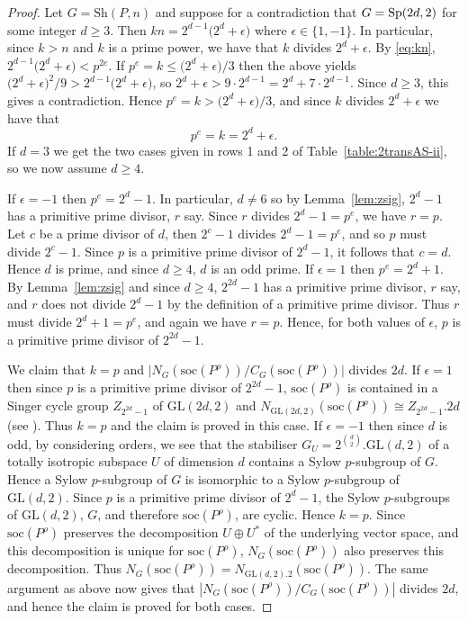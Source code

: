 \documentclass[12pt]{amsart}
\theoremstyle{remark}
\theoremstyle{definition}
\newcounter{claim}[thm]
\newcommand{\soc}{\mathrm{soc}}
\newcommand{\sh}{\mathrm{Sh}}
\newcommand{\GL}{\mathrm{GL}}
\newcommand{\AGL}{\mathrm{AGL}}
\newcommand{\Sp}{\textnormal{Sp}}
\begin{document}
\begin{proof}
Let $G = \sh(P,n)$ and suppose for a contradiction that $G = \Sp(2d,2)$ for some integer $d \geqslant 3$. Then $kn = 2^{d-1}\big(2^d + \epsilon\big)$ where $\epsilon \in \{1,-1\}$. In particular, since $k > n$ and $k$ is a prime power, we have that $k$ divides $2^d + \epsilon$. By \eqref{eq:kn}, $2^{d-1}\big(2^d + \epsilon\big) < p^{2e}$. If $p^e = k \leqslant \big(2^d + \epsilon\big)/3$ then the above yields $\big(2^d + \epsilon\big)^2/9 > 2^{d-1}\big(2^d + \epsilon\big)$, so $2^d + \epsilon > 9 \cdot 2^{d-1} = 2^d + 7 \cdot 2^{d-1}$. Since $d \geqslant 3$, this gives a contradiction. Hence $p^e = k > \big(2^d + \epsilon\big)/3$, and since $k$ divides $2^d + \epsilon$ we have that
	\[ p^e = k = 2^d + \epsilon. \]
 If $d=3$ we get the two cases given in rows 1 and 2 of Table~\ref{table:2transAS-ii}, so we now assume $d\geqslant 4$. 

If $\epsilon = -1$ then $p^e = 2^d - 1$. In particular, $d\neq 6$ so by Lemma~\ref{lem:zsig}, $2^d-1$ has a primitive prime divisor, $r$ say. Since $r$ divides $2^d-1=p^e$, we have $r=p$. Let $c$ be a prime divisor of  $d$, then  $2^c-1$ divides $2^d-1=p^e$, and so $p$ must divide $2^c-1$. Since $p$ is a primitive prime divisor of $2^d-1$, it follows that $c=d$. Hence $d$ is prime, and since $d\geqslant 4$, $d$ is an odd prime.  
 If $\epsilon = 1$ then $p^e = 2^d + 1$.
By Lemma~\ref{lem:zsig} and since $d\geqslant 4$, $2^{2d} - 1$ has a primitive prime divisor, $r$ say, and $r$ does not divide $2^d-1$ by the definition of a primitive prime divisor. Thus $r$ must divide $2^d+1=p^e$, and again we have $r=p$. Hence, for both values of $\epsilon$, $p$ is a primitive prime divisor of $2^{2d}-1$.


We  claim that $k=p$ and $\big|N_G(\soc(P^\rho))/C_G(\soc(P^\rho))\big|$ divides $2d$. If $\epsilon = 1$    then since $p$ is a primitive prime divisor of $2^{2d}-1$, $\soc(P^\rho)$ is contained in a Singer cycle group $Z_{2^{2d}-1}$ of $\GL(2d,2)$ and $N_{\GL(2d,2)}(\soc(P^\rho)) \cong Z_{2^{2d}-1}.2d$ (see \cite[Kapitel II, 7.3]{HuppertI}). Thus $k=p$ and the claim is proved in this case. If $\epsilon = -1$ then  since $d$ is odd, by considering orders, we see that the stabiliser $G_U = 2^{\binom{d}{2}}.\GL(d,2)$ of a totally isotropic subspace $U$ of dimension $d$ contains a Sylow $p$-subgroup of $G$. Hence a Sylow $p$-subgroup of $G$ is isomorphic to a Sylow $p$-subgroup of $\GL(d,2)$. Since $p$ is a primitive prime divisor of $2^d-1$, the Sylow $p$-subgroups of $\GL(d,2)$, $G$, and therefore $\mathrm{soc}(P^\rho)$, are cyclic. Hence  $k=p$.  Since $\soc(P^\rho)$ preserves the decomposition $U \oplus U^*$ of the underlying vector space, and this decomposition is unique for $\soc(P^\rho)$, $N_G(\soc(P^\rho))$ also preserves this decomposition. Thus $N_G(\soc(P^\rho)) = N_{\GL(d,2).2}(\soc(P^\rho))$. The same argument as above now gives that $|N_G( \soc(P^\rho))/C_G(\soc(P^\rho))|$ divides $2d$, and hence the claim is proved for both cases.


\end{proof}
\end{document}
